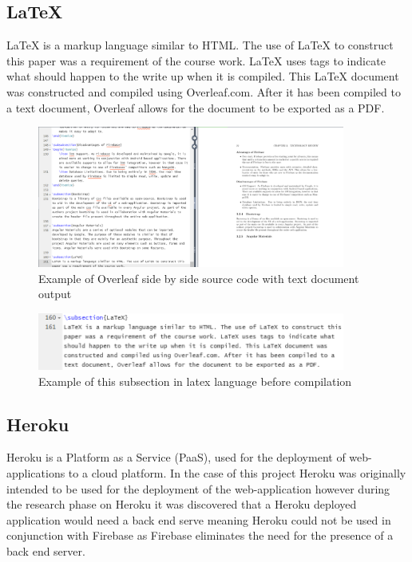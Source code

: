 \subsection{LaTeX}
LaTeX is a markup language similar to HTML. The use of LaTeX to construct this paper was a requirement of the course work. LaTeX uses tags to indicate what should happen to the write up when it is compiled. This LaTeX document was constructed and compiled using Overleaf.com. After it has been compiled to a text document, Overleaf allows for the document to be exported as a PDF. 

\begin{figure}[h!]
    	\caption{Example of Overleaf side by side source code with text document output}
	\centering
	\includegraphics[width=0.9\textwidth]{images/overleaf.png}
\end{figure}

\begin{figure}[h!]
    	\caption{Example of this subsection in latex language before compilation}
	\centering
	\includegraphics[width=0.9\textwidth]{images/latex.png}
\end{figure}

\newpage

\subsection{Heroku}
Heroku is a Platform as a Service (PaaS), used for the deployment of web-applications to a cloud platform. In the case of this project Heroku was originally intended to be used for the deployment of the web-application however during the research phase on Heroku it was discovered that a Heroku deployed application would need a back end serve meaning Heroku could not be used in conjunction with Firebase as Firebase eliminates the need for the presence of a back end server.









